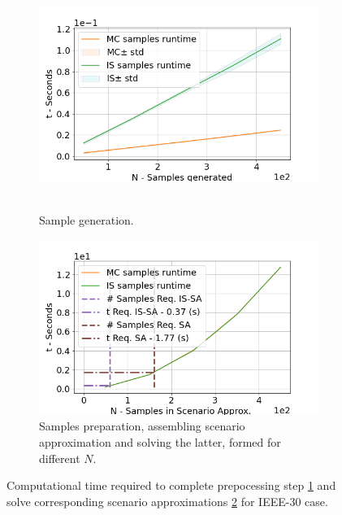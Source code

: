 \begin{figure}[hbt]
\centering
\begin{subfigure}{.8\textwidth}
  \centering
  \includegraphics[width=0.9\linewidth]{Dissertation/images/dc_stochastic_approx/profiling_samplig.png}~~~~~~\hfill
  \caption{Sample generation.}
  \label{fig:profile_generate_samples-dc}
\end{subfigure}
\begin{subfigure}{.8\textwidth}
  \centering
  \hspace{-10mm}\includegraphics[width=0.9\linewidth]{Dissertation/images/dc_stochastic_approx/profiling_approx_sol.png}
  \caption{Samples preparation, assembling scenario approximation and solving the latter, formed for different $N$.}
  \label{fig:profile_scenario_approx-dc}
\end{subfigure}
\caption{Computational time required to complete prepocessing step \ref{fig:profile_generate_samples-dc} and solve corresponding scenario approximations \ref{fig:profile_scenario_approx-dc} for IEEE-30 case. }
\label{fig:profiling-dc}
\end{figure}


